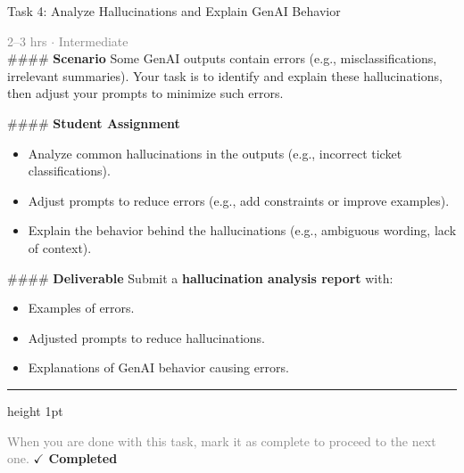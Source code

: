 \documentclass[10pt,a4paper]{article}
\begin{document}
\begin{taskbox}{Task 4: Analyze Hallucinations and Explain GenAI Behavior}

    {\small \textcolor{gray}{2--3 hrs $\cdot$ Intermediate}}\\[12pt]

    \#\#\#\# \textbf{Scenario}
Some GenAI outputs contain errors (e.g., misclassifications, irrelevant summaries). Your task is to identify and explain these hallucinations, then adjust your prompts to minimize such errors.

\#\#\#\# \textbf{Student Assignment}
\begin{itemize}
    \item Analyze common hallucinations in the outputs (e.g., incorrect ticket classifications).
    \item Adjust prompts to reduce errors (e.g., add constraints or improve examples).
    \item Explain the behavior behind the hallucinations (e.g., ambiguous wording, lack of context).
\end{itemize}

\#\#\#\# \textbf{Deliverable}
Submit a \textbf{hallucination analysis report} with:
\begin{itemize}
    \item Examples of errors.
    \item Adjusted prompts to reduce hallucinations.
    \item Explanations of GenAI behavior causing errors.\par
\end{itemize}

    \vspace{16pt}

    \textcolor{cardBorder}{\hrule height 1pt}\vspace{8pt}

    \small \textcolor{gray}{When you are done with this task, mark it as complete to proceed to the next one.} \hfill \textbf{\textcolor{brandDark}{$\checkmark$ Completed}}

\end{taskbox}
\end{document}
